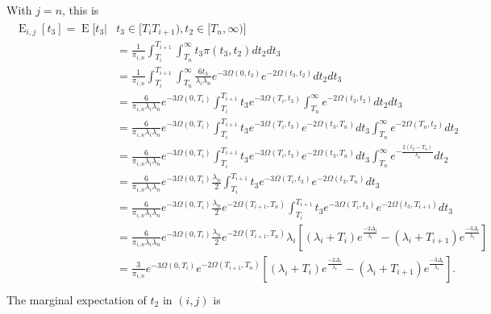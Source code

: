 \documentclass{article}
\DeclareMathOperator{\E}{E}
\begin{document}
With $j = n$, this is
\begin{align}
    \begin{split}
        \E_{i,j}[t_3] = \E\big[t_3|&t_3 \in [T_i T_{i+1}),t_2 \in [T_n,\infty) \big]\\
        &= \frac{1}{\pi_{i,n}}\int_{T_i}^{T_{i+1}}\int_{T_n}^{\infty}t_3\pi(t_3,t_2)dt_2dt_3\\
        &= \frac{1}{\pi_{i,n}}\int_{T_i}^{T_{i+1}}\int_{T_n}^{\infty}
            \frac{6t_3}{\lambda_i \lambda_n}e^{-3\Omega(0,t_3)}e^{-2\Omega(t_3,t_2)}dt_2dt_3\\
        &=\frac{6}{\pi_{i,n}\lambda_i\lambda_n}e^{-3\Omega(0,T_i)}
            \int_{T_i}^{T_{i+1}}t_3e^{-3\Omega(T_i,t_3)}\int_{T_n}^{\infty}e^{-2\Omega(t_3,t_2)}dt_2dt_3\\
        &=\frac{6}{\pi_{i,n}\lambda_i\lambda_n}e^{-3\Omega(0,T_i)}
            \int_{T_i}^{T_{i+1}}t_3e^{-3\Omega(T_i,t_3)}e^{-2\Omega(t_3,T_n)}dt_3\int_{T_n}^{\infty}e^{-2\Omega(T_n,t_2)}dt_2\\
        &=\frac{6}{\pi_{i,n}\lambda_i\lambda_n}e^{-3\Omega(0,T_i)}
            \int_{T_i}^{T_{i+1}}t_3e^{-3\Omega(T_i,t_3)}e^{-2\Omega(t_3,T_n)}dt_3\int_{T_n}^{\infty}e^{-\frac{2(t_2-T_n)}{\lambda_n}}dt_2\\
        &=\frac{6}{\pi_{i,n}\lambda_i\lambda_n}e^{-3\Omega(0,T_i)}\frac{\lambda_n}{2}
            \int_{T_i}^{T_{i+1}}t_3e^{-3\Omega(T_i,t_3)}e^{-2\Omega(t_3,T_n)}dt_3\\
        &=\frac{6}{\pi_{i,n}\lambda_i\lambda_n}e^{-3\Omega(0,T_i)}
            \frac{\lambda_n}{2}e^{-2\Omega(T_{i+1},T_n)}
            \int_{T_i}^{T_{i+1}}t_3e^{-3\Omega(T_i,t_3)}e^{-2\Omega(t_3,T_{i+1})}dt_3\\
        &=\frac{6}{\pi_{i,n}\lambda_i\lambda_n}e^{-3\Omega(0,T_i)}
            \frac{\lambda_n}{2}e^{-2\Omega(T_{i+1},T_n)}
            \lambda_i\left[(\lambda_i+T_i)e^{\frac{-2\Delta_i}{\lambda_i}}-(\lambda_i+T_{i+1})e^{\frac{-3\Delta_i}{\lambda_i}}\right]\\
        &=\frac{3}{\pi_{i,n}}e^{-3\Omega(0,T_i)}
            e^{-2\Omega(T_{i+1},T_n)}
            \left[(\lambda_i+T_i)e^{\frac{-2\Delta_i}{\lambda_i}}-(\lambda_i+T_{i+1})e^{\frac{-3\Delta_i}{\lambda_i}}\right].\\
    \end{split}
    \label{eq:Et3}
\end{align}
The marginal expectation of $t_2$ in $(i,j)$ is 
\end{document}
